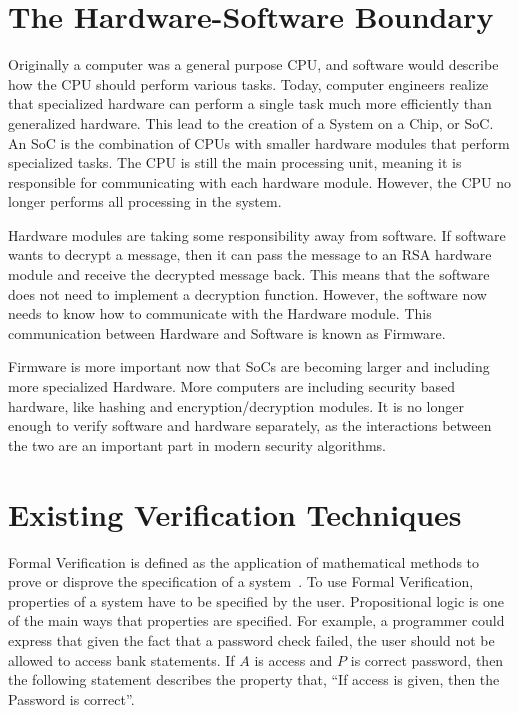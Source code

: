 \section{The Hardware-Software Boundary}

Originally a computer was a general purpose CPU, and software would
describe how the CPU should perform various tasks.
Today, computer engineers realize that specialized hardware can perform a single
task much more efficiently than generalized hardware.
This lead to the creation of a System on a Chip, or SoC. An SoC is the
combination of CPUs with smaller hardware modules that perform specialized
tasks.
The CPU is still the main processing unit, meaning it is responsible for
communicating with each hardware module.
However, the CPU no longer performs all processing in the system.

Hardware modules are taking some responsibility away from software.
If software wants to decrypt a message, then it can pass the message to an RSA
hardware module and receive the decrypted message back.
This means that the software does not need to implement a decryption function.
However, the software now needs to know how to communicate with the Hardware
module. This communication between Hardware and Software is known as Firmware.

Firmware is more important now that SoCs are becoming larger and including more
specialized Hardware. 
More computers are including security based hardware, like hashing and encryption/decryption modules.
It is no longer enough to verify software and hardware separately, as the
interactions between the two are an important part in modern security
algorithms.

\section{Existing Verification Techniques}

Formal Verification is defined as the application of mathematical methods to
prove or disprove the specification of a system~\cite{greenstreet}.
To use Formal Verification, properties of a system have to be specified by the
user. 
Propositional logic is one of the main ways that properties are specified.
For example, a programmer could express that given the fact that a password
check failed, the user should not be allowed to access bank statements.
If $A$ is access and $P$ is correct password, then the following statement
describes the property that, ``If access is given, then the Password is correct''.

